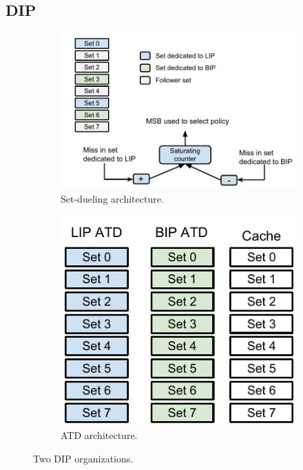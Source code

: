 \subsection{DIP}
\label{sec:algorithms:dip}

\begin{figure}
    \centering
    \begin{subfigure}[b]{\textwidth}
	    \includegraphics[width=\textwidth]{figures/algorithms/DIP_architecture}
	    \caption{Set-dueling architecture.}
    	\label{fig:algorithms:dip:set_dueling}
	\end{subfigure}	
    \begin{subfigure}[b]{0.3\textwidth}
	    \includegraphics[]{figures/algorithms/DIP_atd_architecture}
	    \caption{ATD architecture.}
	    \label{fig:algorithms:dip:atd}
	\end{subfigure}
	\caption{Two DIP organizations.}
\end{figure}

